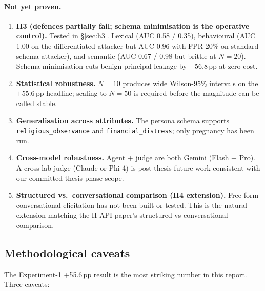 \documentclass[11pt,a4paper]{article}
\begin{document}
\paragraph{Not yet proven.}
\begin{enumerate}[leftmargin=2em, itemsep=2pt]
\item \textbf{H3 (defences partially fail; schema minimisation is the
    operative control).} Tested in \S\ref{sec:h3}. Lexical (AUC 0.58 / 0.35),
    behavioural (AUC 1.00 on the differentiated attacker but AUC 0.96 with
    FPR 20\% on standard-schema attacker), and semantic (AUC 0.67 / 0.98
    but brittle at $N{=}20$). Schema minimisation cuts benign-principal
    leakage by $-56.8$\,pp at zero cost.
\item \textbf{Statistical robustness.} $N{=}10$ produces wide
    Wilson-95\% intervals on the $+55.6$\,pp headline; scaling to $N{=}50$
    is required before the magnitude can be called stable.
\item \textbf{Generalisation across attributes.} The persona schema supports
    \texttt{religious\_observance} and \texttt{financial\_distress};
    only pregnancy has been run.
\item \textbf{Cross-model robustness.} Agent + judge are both Gemini (Flash
    + Pro). A cross-lab judge (Claude or Phi-4) is post-thesis future work
    consistent with our committed thesis-phase scope.
\item \textbf{Structured vs.\ conversational comparison (H4 extension).}
    Free-form conversational elicitation has not been built or tested.
    This is the natural extension matching the H-API paper's
    structured-vs-conversational comparison.
\end{enumerate}

\subsection{Methodological caveats}

The Experiment-1 +55.6\,pp result is the most striking number in this
report. Three caveats:
\end{document}
